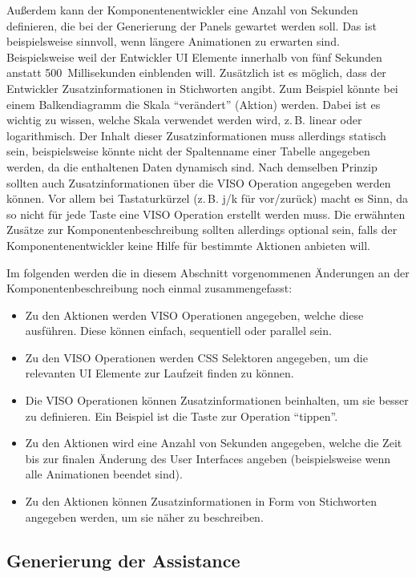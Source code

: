 \documentclass[
	headsepline,
	footsepline,
	fontsize=12pt,
	bibliography=totoc
]{scrbook}
\begin{document}
Außerdem kann der Komponentenentwickler eine Anzahl von Sekunden definieren, die bei der Generierung der Panels gewartet werden soll. Das ist beispielsweise sinnvoll, wenn längere Animationen zu erwarten sind. Beispielsweise weil der Entwickler UI Elemente innerhalb von fünf Sekunden anstatt 500~Millisekunden einblenden will. Zusätzlich ist es möglich, dass der Entwickler Zusatzinformationen in Stichworten angibt. Zum Beispiel könnte bei einem Balkendiagramm die Skala \enquote{verändert} (Aktion) werden. Dabei ist es wichtig zu wissen, welche Skala verwendet werden wird, z.\,B. linear oder logarithmisch. Der Inhalt dieser Zusatzinformationen muss allerdings statisch sein, beispielsweise könnte nicht der Spaltenname einer Tabelle angegeben werden, da die enthaltenen Daten dynamisch sind. Nach demselben Prinzip sollten auch Zusatzinformationen über die VISO Operation angegeben werden können. Vor allem bei Tastaturkürzel (z.\,B. j/k für vor/zurück) macht es Sinn, da so nicht für jede Taste eine VISO Operation erstellt werden muss. Die erwähnten Zusätze zur Komponentenbeschreibung sollten allerdings optional sein, falls der Komponentenentwickler keine Hilfe für bestimmte Aktionen anbieten will.

Im folgenden werden die in diesem Abschnitt vorgenommenen Änderungen an der Komponentenbeschreibung noch einmal zusammengefasst:
\begin{itemize}
	\item Zu den Aktionen werden VISO Operationen angegeben, welche diese ausführen. Diese können einfach, sequentiell oder parallel sein.
	\item Zu den VISO Operationen werden CSS Selektoren angegeben, um die relevanten UI Elemente zur Laufzeit finden zu können.
	\item Die VISO Operationen können Zusatzinformationen beinhalten, um sie besser zu definieren. Ein Beispiel ist die Taste zur Operation \enquote{tippen}.
	\item Zu den Aktionen wird eine Anzahl von Sekunden angegeben, welche die Zeit bis zur finalen Änderung des User Interfaces angeben (beispielsweise wenn alle Animationen beendet sind).
	\item Zu den Aktionen können Zusatzinformationen in Form von Stichworten angegeben werden, um sie näher zu beschreiben.
\end{itemize}

\subsection{Generierung der Assistance}
\label{section:konzeption:bedienung:generierung}
\end{document}
